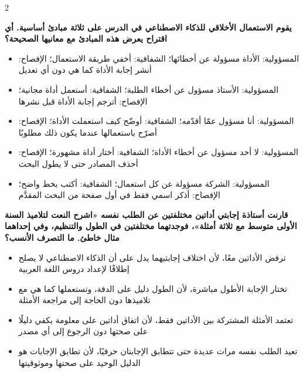 \documentclass[10pt,a4paper]{article}
\begin{document}
\begin{multicols}{2}
\noindent\begin{minipage}{\linewidth}
\hangindent=0.7cm\textbf{يقوم الاستعمال الأخلاقي للذكاء الاصطناعي في الدرس على ثلاثة مبادئ أساسية. أي اقتراح يعرض هذه المبادئ مع معانيها الصحيحة؟}
\begin{itemize}[leftmargin=0.95cm, labelsep=4pt, itemsep=1pt, topsep=3pt, parsep=0pt]
  \item[\textbf{أ)}] المسؤولية: الأداة مسؤولة عن أخطائها؛ الشفافية: أخفي طريقة الاستعمال؛ الإفصاح: أنشر إجابة الأداة كما هي دون أي تعديل
  \item[\textbf{ب)}] المسؤولية: الأستاذ مسؤول عن أخطاء الطلبة؛ الشفافية: أستعمل أداة مجانية؛ الإفصاح: أترجم إجابة الأداة قبل نشرها
  \item[\textbf{ج)}] المسؤولية: أنا مسؤول عمّا أقدّمه؛ الشفافية: أوضّح كيف استعملت الأداة؛ الإفصاح: أصرّح باستعمالها عندما يكون ذلك مطلوبًا
  \item[\textbf{د)}] المسؤولية: لا أحد مسؤول عن أخطاء الأداة؛ الشفافية: أختار أداة مشهورة؛ الإفصاح: أحذف المصادر حتى لا يطول البحث
  \item[\textbf{هـ)}] المسؤولية: الشركة مسؤولة عن كل استعمال؛ الشفافية: أكتب بخط واضح؛ الإفصاح: أذكر اسمي فقط في أول صفحة من البحث المقدَّم
\end{itemize}
\end{minipage}\par\vspace{8pt plus 6pt}
\noindent\begin{minipage}{\linewidth}
\hangindent=0.7cm\textbf{قارنت أستاذة إجابتي أداتين مختلفتين عن الطلب نفسه «اشرح النعت لتلاميذ السنة الأولى متوسط مع ثلاثة أمثلة»، فوجدتهما مختلفتين في الطول والتنظيم، وفي إحداهما مثال خاطئ. ما التصرف الأنسب؟}
\begin{itemize}[leftmargin=0.95cm, labelsep=4pt, itemsep=1pt, topsep=3pt, parsep=0pt]
  \item[\textbf{أ)}] ترفض الأداتين معًا، لأن اختلاف إجابتيهما يدل على أن الذكاء الاصطناعي لا يصلح إطلاقًا لإعداد دروس اللغة العربية
  \item[\textbf{ب)}] تختار الإجابة الأطول مباشرة، لأن الطول دليل على الدقة، وتستعملها كما هي مع تلاميذها دون الحاجة إلى مراجعة الأمثلة
  \item[\textbf{ج)}] تعتمد الأمثلة المشتركة بين الأداتين فقط، لأن اتفاق أداتين على معلومة يكفي دليلًا على صحتها دون الرجوع إلى أي مصدر
  \item[\textbf{د)}] تعيد الطلب نفسه مرات عديدة حتى تتطابق الإجابتان حرفيًا، لأن تطابق الإجابات هو الدليل الوحيد على صحتها وموثوقيتها

\end{itemize}
\end{minipage}
\end{multicols}
\end{document}

